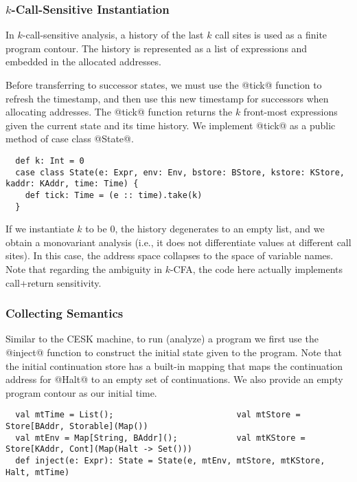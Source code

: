 \documentclass[acmsmall, review]{acmart}\settopmatter{}
\begin{document}
\subsubsection{$k$-Call-Sensitive Instantiation} \label{kcfainst}

In $k$-call-sensitive analysis, a history of the last $k$ call sites is used as a 
finite program contour. The history is represented as a list of expressions and embedded
in the allocated addresses.

Before transferring to successor states, we must use the @tick@ function to refresh the 
timestamp, and then use this new timestamp for successors when allocating addresses.
The @tick@ function returns the $k$ front-most expressions given the current state and its
time history. We implement @tick@ as a public method of case class @State@.

\begin{lstlisting}
  def k: Int = 0
  case class State(e: Expr, env: Env, bstore: BStore, kstore: KStore, kaddr: KAddr, time: Time) {
    def tick: Time = (e :: time).take(k)
  }
\end{lstlisting}

If we instantiate $k$ to be $0$, the history degenerates to an empty list, and we obtain
a monovariant analysis (i.e., it does not differentiate values at different call sites).
In this case, the address space collapses to the space of variable names.
Note that regarding the ambiguity in $k$-CFA\cite{Gilray:2016:ACP:2951913.2951936},
the code here actually implements call+return sensitivity.

\subsubsection{Collecting Semantics}

Similar to the CESK machine, to run (analyze) a program we first use the @inject@ function
to construct the initial state given to the program. Note that the initial continuation store
has a built-in mapping that maps the continuation address for @Halt@ to an empty set of 
continuations. We also provide an empty program contour as our initial time.

\begin{lstlisting}
  val mtTime = List();                         val mtStore = Store[BAddr, Storable](Map())
  val mtEnv = Map[String, BAddr]();            val mtKStore = Store[KAddr, Cont](Map(Halt -> Set()))
  def inject(e: Expr): State = State(e, mtEnv, mtStore, mtKStore, Halt, mtTime)
\end{lstlisting}
\end{document}
